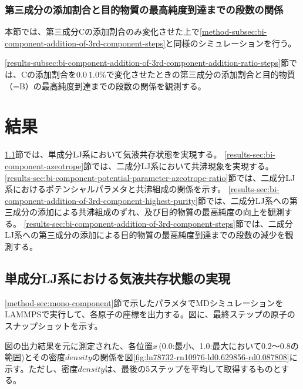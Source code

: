 \documentclass[titlepage]{jsreport}
\begin{document}
\subsection{第三成分の添加割合と目的物質の最高純度到達までの段数の関係} \label{method-subsec:bi-component-addition-of-3rd-component-addition-ratio-steps}
本節では、第三成分Cの添加割合のみ変化させた上で\ref{method-subsec:bi-component-addition-of-3rd-component-steps}と同様のシミュレーションを行う。

\ref{results-subsec:bi-component-addition-of-3rd-component-addition-ratio-steps}節では、Cの添加割合を$0.0~1.0\%$で変化させたときの第三成分の添加割合と目的物質（=B）の最高純度到達までの段数の関係を観測する。


\chapter{結果} \label{chap:results}
\ref{results-sec:mono-component}節では、単成分LJ系において気液共存状態を実現する。
\ref{results-sec:bi-component-azeotrope}節では、二成分LJ系において共沸現象を実現する。
\ref{results-sec:bi-component-potential-parameter-azeotrope-ratio}節では、二成分LJ系におけるポテンシャルパラメタと共沸組成の関係を示す。
\ref{results-sec:bi-component-addition-of-3rd-component-highest-purity}節では、二成分LJ系への第三成分の添加による共沸組成のずれ、及び目的物質の最高純度の向上を観測する。
\ref{results-sec:bi-component-addition-of-3rd-component-steps}節では、二成分LJ系への第三成分の添加による目的物質の最高純度到達までの段数の減少を観測する。

\section{単成分LJ系における気液共存状態の実現} \label{results-sec:mono-component}
\ref{method-sec:mono-component}節で示したパラメタでMDシミュレーションをLAMMPSで実行して、各原子の座標を出力する。図に、最終ステップの原子のスナップショットを示す。

図の出力結果を元に測定された、各位置$x$\,(0.0:最小、1.0:最大において0.2〜0.8の範囲)とその密度$density$の関係を図\ref{fig:ln78732-rn10976-ld0.629856-rd0.087808}に示す。ただし、密度$density$は、最後の5ステップを平均して取得するものとする。
\end{document}
